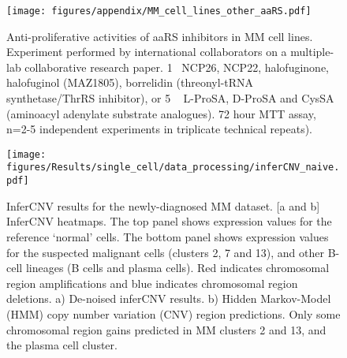 \begin{figure}[h]
\centering
\texttt{[image: figures/appendix/MM\_cell\_lines\_other\_aaRS.pdf]}
\caption[aaRS inhibitors anti-proliferative activity in MM cell lines]{Anti-proliferative activities of aaRS inhibitors in MM cell lines.
Experiment performed by international collaborators on a multiple-lab collaborative research paper\cite{bottpreclinical2022}.
1\si{\micro\Molar} NCP26, NCP22, halofuginone, halofuginol (MAZ1805), borrelidin (threonyl-tRNA synthetase/ThrRS inhibitor), or 5 \si{\micro\Molar} L-ProSA, D-ProSA and CysSA (aminoacyl adenylate substrate analogues).
72 hour MTT assay, n=2-5 independent experiments in triplicate technical repeats).
}
\label{fig:sup_cell_line_aaRS}
\end{figure}

\afterpage{\clearpage}


\begin{figure}[h]
    \centering
    \texttt{[image: figures/Results/single\_cell/data\_processing/inferCNV\_naive.pdf]}
    \caption[inferCNV- newly-diagnosed MM]{InferCNV results for the newly-diagnosed MM dataset.
    [a and b] InferCNV heatmaps.
        The top panel shows expression values for the reference `normal' cells.
        The bottom panel shows expression values for the suspected malignant cells (clusters 2, 7 and 13), and other B-cell lineages (B cells and plasma cells).
        Red indicates chromosomal region amplifications and blue indicates chromosomal region deletions.
    a) De-noised inferCNV results.
    b) Hidden Markov-Model (HMM) copy number variation (CNV) region predictions.
        Only some chromosomal region gains predicted in MM clusters 2 and 13, and the plasma cell cluster.
    }
    \label{fig:inferCNV_naive}
\end{figure}
%